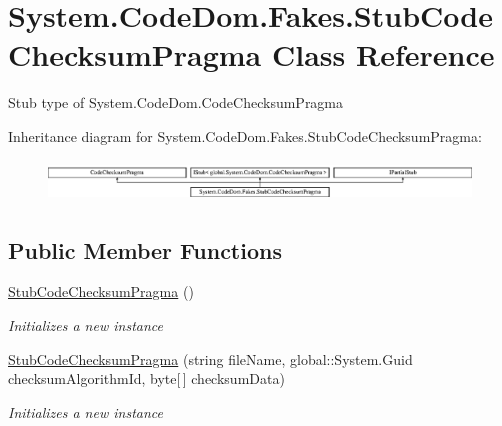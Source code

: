 \hypertarget{class_system_1_1_code_dom_1_1_fakes_1_1_stub_code_checksum_pragma}{\section{System.\-Code\-Dom.\-Fakes.\-Stub\-Code\-Checksum\-Pragma Class Reference}
\label{class_system_1_1_code_dom_1_1_fakes_1_1_stub_code_checksum_pragma}
}


Stub type of System.\-Code\-Dom.\-Code\-Checksum\-Pragma 


Inheritance diagram for System.\-Code\-Dom.\-Fakes.\-Stub\-Code\-Checksum\-Pragma\-:\begin{figure}[H]
\begin{center}
\leavevmode
\includegraphics[height=1.085271cm]{class_system_1_1_code_dom_1_1_fakes_1_1_stub_code_checksum_pragma}
\end{center}
\end{figure}
\subsection*{Public Member Functions}
\begin{DoxyCompactItemize}
\item 
\hyperlink{class_system_1_1_code_dom_1_1_fakes_1_1_stub_code_checksum_pragma_aa922b762d469ac8a4c89d6e503643e1d}{Stub\-Code\-Checksum\-Pragma} ()
\begin{DoxyCompactList}\small\item\em Initializes a new instance\end{DoxyCompactList}\item 
\hyperlink{class_system_1_1_code_dom_1_1_fakes_1_1_stub_code_checksum_pragma_a70e62a84f3bbba34c5d03b4c692aef9b}{Stub\-Code\-Checksum\-Pragma} (string file\-Name, global\-::\-System.\-Guid checksum\-Algorithm\-Id, byte\mbox{[}$\,$\mbox{]} checksum\-Data)
\begin{DoxyCompactList}\small\item\em Initializes a new instance\end{DoxyCompactList}\end{DoxyCompactItemize}
